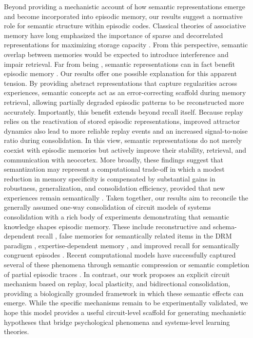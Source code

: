 \documentclass{article}
\providecommand{\DIFaddtex}[1]{{\protect\color{blue}\uwave{#1}}} %
\providecommand{\DIFaddbegin}{} %
\providecommand{\DIFaddend}{} %
\providecommand{\DIFadd}[1]{\texorpdfstring{\DIFaddtex{#1}}{#1}} %
\begin{document}
Beyond providing a mechanistic account of how semantic representations emerge and become incorporated into episodic memory, our results suggest a normative role for semantic structure within episodic codes. Classical theories of associative memory have long emphasized the importance of sparse and decorrelated representations for maximizing storage capacity . From this perspective, semantic overlap between memories would be expected to introduce interference and impair retrieval. Far from being  \DIFaddbegin \DIFadd{detrimental}\DIFaddend , semantic representations can in fact benefit episodic memory . Our results offer one possible explanation for this apparent tension. By providing abstract representations that capture regularities across experiences, semantic concepts act as an error-correcting scaffold during memory retrieval, allowing partially degraded episodic patterns to be reconstructed more accurately. Importantly, this benefit extends beyond recall itself. Because replay relies on the reactivation of stored episodic representations, improved attractor dynamics also lead to more reliable replay events and an increased signal-to-noise ratio during consolidation. In this view, semantic representations do not merely coexist with episodic memories but actively improve their stability, retrieval, and communication with neocortex. More broadly, these findings suggest that semantization may represent a computational trade-off in which a modest reduction in memory specificity is compensated by substantial gains in robustness, generalization, and consolidation efficiency, provided that new experiences remain semantically  \DIFaddbegin \DIFadd{in-distribution}\DIFaddend .
\newline\newline
Taken together, our results aim to reconcile the generally assumed one-way consolidation of circuit models of systems consolidation  with a rich body of experiments demonstrating that semantic knowledge shapes episodic memory. These include reconstructive and schema-dependent recall , false memories for semantically related items in the DRM paradigm , expertise-dependent memory , and improved recall for semantically congruent episodes . Recent computational models have successfully captured several of these phenomena through semantic compression  or semantic completion of partial episodic traces . In contrast, our work proposes an explicit  circuit mechanism based on replay, local plasticity, and bidirectional consolidation, providing a biologically grounded framework in which these semantic effects can emerge. While the specific mechanisms remain to be experimentally validated, we hope this model provides a useful circuit-level scaffold for generating mechanistic hypotheses that bridge psychological phenomena and systems-level learning theories.
\end{document}
